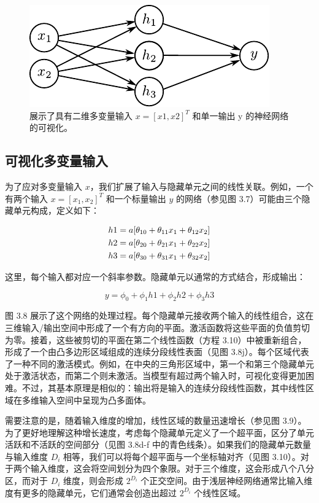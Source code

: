 \documentclass[lang=cn,newtx,10pt,scheme=chinese]{elegantbook}
\begin{document}
\begin{figure}[ht!]
	\centering
	\includegraphics[width=0.7\linewidth]{PDFFigures/UDLChap3PDF/ShallowNetTwoInputs.pdf}
\caption{展示了具有二维多变量输入 $x = [x1, x2]^T$ 和单一输出 y 的神经网络的可视化。}
\end{figure}

\subsection{可视化多变量输入}

为了应对多变量输入 \(x\)，我们扩展了输入与隐藏单元之间的线性关联。例如，一个有两个输入 \(x = [x_1, x_2]^T\) 和一个标量输出 \(y\) 的网络（参见图 3.7）可能由三个隐藏单元构成，定义如下：


\begin{align}
	h1 = a[\theta_{10} + \theta_{11}x_1 + \theta_{12}x_2] \notag \\
	h2 = a[\theta_{20} + \theta_{21}x_1 + \theta_{22}x_2] \notag \\
	h3 = a[\theta_{30} + \theta_{31}x_1 + \theta_{32}x_2] 
\end{align} 



这里，每个输入都对应一个斜率参数。隐藏单元以通常的方式结合，形成输出：

\begin{equation}
y = \phi_0 + \phi_1h1 + \phi_2h2 + \phi_3h3 
\end{equation}


图 3.8 展示了这个网络的处理过程。每个隐藏单元接收两个输入的线性组合，这在三维输入/输出空间中形成了一个有方向的平面。激活函数将这些平面的负值剪切为零。接着，这些被剪切的平面在第二个线性函数（方程 3.10）中被重新组合，形成了一个由凸多边形区域组成的连续分段线性表面（见图 3.8j）。每个区域代表了一种不同的激活模式。例如，在中央的三角形区域中，第一个和第三个隐藏单元处于激活状态，而第二个则未激活。当模型有超过两个输入时，可视化变得更加困难。不过，其基本原理是相似的：输出将是输入的连续分段线性函数，其中线性区域在多维输入空间中呈现为凸多面体。

需要注意的是，随着输入维度的增加，线性区域的数量迅速增长（参见图 3.9）。为了更好地理解这种增长速度，考虑每个隐藏单元定义了一个超平面，区分了单元活跃和不活跃的空间部分（见图 3.8d-f 中的青色线条）。如果我们的隐藏单元数量与输入维度 \(D_i\) 相等，我们可以将每个超平面与一个坐标轴对齐（见图 3.10）。对于两个输入维度，这会将空间划分为四个象限。对于三个维度，这会形成八个八分区，而对于 \(D_i\) 维度，则会形成 \(2^{D_i}\) 个正交空间。由于浅层神经网络通常比输入维度有更多的隐藏单元，它们通常会创造出超过 \(2^{D_i}\) 个线性区域。
\end{document}
